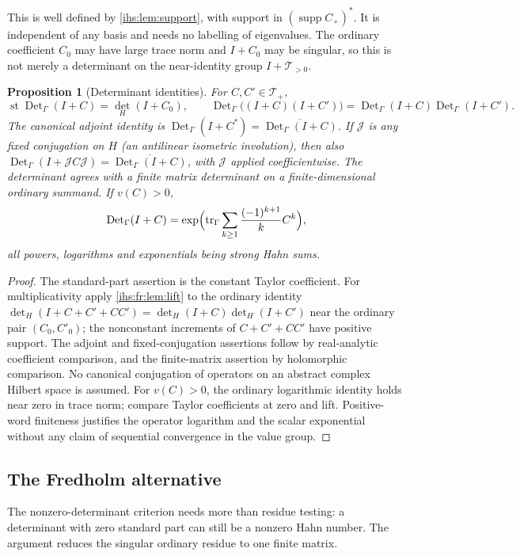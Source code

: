 \documentclass[11pt,a4paper]{article}
\numberwithin{equation}{section}
\newtheorem{proposition}[proposition]{Proposition}
\theoremstyle{definition}
\theoremstyle{remark}
\newcommand{\supp}{\operatorname{supp}}
\newcommand{\st}{\operatorname{st}}
\newcommand{\Tr}{\operatorname{tr}}
\newcommand{\Det}{\operatorname{Det}_\Gamma}
\newcommand{\TT}{\mathscr T}
\begin{document}
This is well defined by \cref{ihs:lem:support}, with support in
$(\supp C_+)^*$. It is independent of any basis and needs no labelling of
eigenvalues. The ordinary coefficient $C_0$ may have large trace norm and
$I+C_0$ may be singular, so this is not merely a determinant on the
near-identity group $I+\TT_{>0}$.

\begin{proposition}[Determinant identities]\label{ihs:fr:prop:detidentities}
For $C,C'\in\TT_+$,
\begin{equation}\label{ihs:fr:eq:detidentities}
 \st\Det(I+C)=\det_H(I+C_0),\qquad
 \Det\bigl((I+C)(I+C')\bigr)=\Det(I+C)\Det(I+C').
\end{equation}
The canonical adjoint identity is
$\Det(I+C^*)=\overline{\Det(I+C)}$. If $\mathcal J$ is any fixed
conjugation on $H$ (an antilinear isometric involution), then also
$\Det(I+\mathcal JC\mathcal J)=\overline{\Det(I+C)}$, with
$\mathcal J$ applied coefficientwise. The determinant agrees with a finite
matrix determinant on a finite-dimensional ordinary summand. If $v(C)>0$,
\begin{equation}\label{ihs:fr:eq:detlog}
 \Det(I+C)=\exp\Bigl(\Tr_\Gamma\sum_{k\ge1}\frac{(-1)^{k+1}}kC^k\Bigr),
\end{equation}
all powers, logarithms and exponentials being strong Hahn sums.
\end{proposition}
\begin{proof}
The standard-part assertion is the constant Taylor coefficient. For
multiplicativity apply \cref{ihs:fr:lem:lift} to the ordinary identity
$\det_H(I+C+C'+CC')=\det_H(I+C)\det_H(I+C')$ near the ordinary pair
$(C_0,C'_0)$; the nonconstant increments of $C+C'+CC'$ have positive support.
The adjoint and fixed-conjugation assertions follow by real-analytic
coefficient comparison, and the finite-matrix assertion by holomorphic
comparison. No canonical conjugation of operators on an abstract complex
Hilbert space is assumed. For
$v(C)>0$, the ordinary logarithmic identity holds near zero in trace norm;
compare Taylor coefficients at zero and lift. Positive-word finiteness
justifies the operator logarithm and the scalar exponential without any
claim of sequential convergence in the value group.
\end{proof}

\subsection{The Fredholm alternative}\label{ihs:fr:sec:alternative}
The nonzero-determinant criterion needs more than residue testing: a
determinant with zero standard part can still be a nonzero Hahn number. The
argument reduces the singular ordinary residue to one finite matrix.
\end{document}
